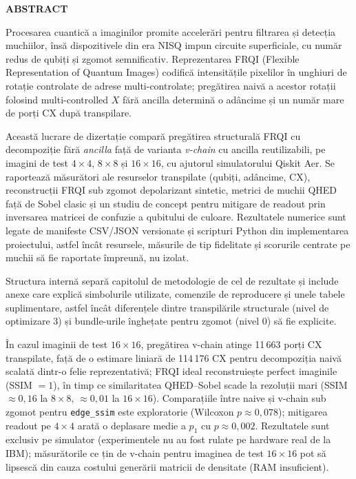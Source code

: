 \thispagestyle{abstractpagestyle}

\vspace*{36pt}

\begin{center}
\textbf{\fontsize{20pt}{24pt} \selectfont ABSTRACT}
\end{center}

\vspace{24pt}

Procesarea cuantică a imaginilor promite accelerări pentru filtrarea și detecția muchiilor, însă dispozitivele din era NISQ impun circuite superficiale, cu număr redus de qubiți și zgomot semnificativ. Reprezentarea FRQI (Flexible Representation of Quantum Images) codifică intensitățile pixelilor în unghiuri de rotație controlate de adrese multi-controlate; pregătirea naivă a acestor rotații folosind multi-controlled $X$ fără ancilla determină o adâncime și un număr mare de porți CX după transpilare.

Această lucrare de dizertație compară pregătirea structurală FRQI cu decompoziție fără \emph{ancilla} față de varianta \emph{v-chain} cu ancilla reutilizabili, pe imagini de test $4\times 4$, $8\times 8$ și $16\times 16$, cu ajutorul simulatorului Qiskit Aer. Se raportează măsurători ale resurselor transpilate (qubiți, adâncime, CX), reconstrucții FRQI sub zgomot depolarizant sintetic, metrici de muchii QHED față de Sobel clasic și un studiu de concept pentru mitigare de readout prin inversarea matricei de confuzie a qubitului de culoare. Rezultatele numerice sunt legate de manifeste CSV/JSON versionate și scripturi Python din implementarea proiectului, astfel încât resursele, măsurile de tip fidelitate și scorurile centrate pe muchii să fie raportate împreună, nu izolat.

Structura internă separă capitolul de metodologie de cel de rezultate și include anexe care explică simbolurile utilizate, comenzile de reproducere și unele tabele suplimentare, astfel încât diferențele dintre transpilările structurale (nivel de optimizare 3) și bundle-urile înghețate pentru zgomot (nivel 0) să fie explicite.

În cazul imaginii de test $16\times 16$, pregătirea v-chain atinge 11\,663 porți CX transpilate, față de o estimare liniară de 114\,176 CX pentru decompoziția naivă scalată dintr-o felie reprezentativă; FRQI ideal reconstruiește perfect imaginile (SSIM $=1$), în timp ce similaritatea QHED--Sobel scade la rezoluții mari (SSIM $\approx 0{,}16$ la $8\times 8$, $\approx 0{,}01$ la $16\times 16$). Comparațiile între naive și v-chain sub zgomot pentru \texttt{edge\_ssim} este exploratorie (Wilcoxon $p\approx 0{,}078$); mitigarea readout pe $4\times 4$ arată o deplasare medie a $p_1$ cu $p\approx 0{,}002$. Rezultatele sunt exclusiv pe simulator (experimentele nu au fost rulate pe hardware real de la IBM); măsurătorile ce țin de v-chain pentru imaginea de test $16\times 16$ pot să lipsescă din cauza costului generării matricii de densitate (RAM insuficient).

\vfill
